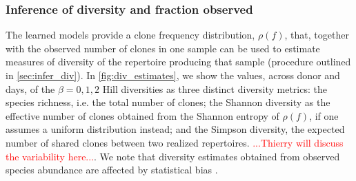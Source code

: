 \documentclass[letterpaper,english,prl,reprint,longbibliography]{revtex4-1} %
\begin{document}
\subsubsection*{Inference of diversity and fraction observed}

The learned models provide a clone frequency distribution, $\rho(f)$, that, together with the observed number of clones in one sample can be used to estimate measures of diversity of the repertoire producing that sample (procedure outlined in \cref{sec:infer_div}). In  \cref{fig:div_estimates}, we show the values, across donor and days, of the $\beta=0,1,2$ Hill diversities as three distinct diversity metrics: the species richness, i.e. the total number of clones; the Shannon diversity as the effective number of clones obtained from the Shannon entropy of $\rho(f)$, if one assumes a uniform distribution instead; and the Simpson diversity, the expected number of shared clones between two realized repertoires. \textcolor{red}{...Thierry will discuss the variability here...}. We note that diversity estimates obtained from observed species abundance are affected by statistical bias \citep{Mora2018}.

% 
% 
\end{document}
